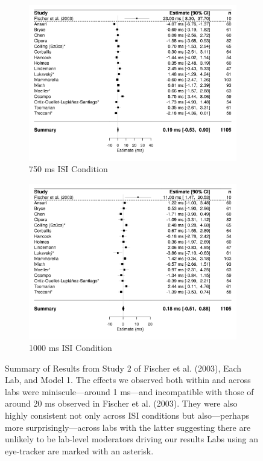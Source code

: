 \documentclass[A4paper,man,floatsintext]{apa6}
\theoremstyle{definition}
\theoremstyle{definition}
\theoremstyle{definition}
\theoremstyle{remark}
\begin{document}
\begin{figure}[H]
\begin{subfigure}{.7\textwidth}
        \includegraphics[]{d750}
        \caption{750 ms ISI Condition}
    \end{subfigure}
    \begin{subfigure}{.7\textwidth}
        \includegraphics[]{d1000}
        \caption{1000 ms ISI Condition}
    \end{subfigure}
    \caption{Summary of Results from Study 2 of Fischer et al. (2003), Each Lab, and Model 1. The effects we observed both within and across labs were miniscule---around 1 ms---and incompatible with those of around 20 ms observed in Fischer et al. (2003). They were also highly consistent not only across ISI conditions but also---perhaps more surprisingly---across labs with the latter suggesting there are unlikely to be lab-level moderators driving our results Labs using an eye-tracker are marked with an asterisk.}\label{fig:model1}
\end{figure}
\end{document}
